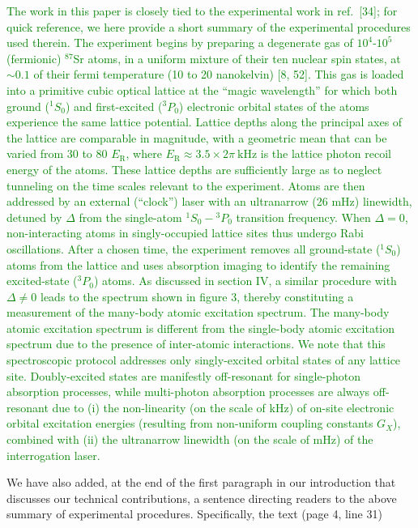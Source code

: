 \documentclass[preprint]{revtex4-1}
\renewcommand{\t}{\text} %
\newcommand{\1}{\mathds{1}}
\newcommand{\green}[1]{\textcolor{green}{#1}}
\begin{document}
\begin{enumerate}
  \green{The work in this paper is closely tied to the experimental
    work in ref.~[34]; for quick reference, we here provide a short
    summary of the experimental procedures used therein.  The
    experiment begins by preparing a degenerate gas of $10^4$-$10^5$
    (fermionic) ${}^{87}$Sr atoms, in a uniform mixture of their ten
    nuclear spin states, at $\sim0.1$ of their fermi temperature (10
    to 20 nanokelvin) [8, 52].  This gas is loaded into a primitive
    cubic optical lattice at the ``magic wavelength'' for which both
    ground (${}^1S_0$) and first-excited (${}^3P_0$) electronic
    orbital states of the atoms experience the same lattice potential.
    Lattice depths along the principal axes of the lattice are
    comparable in magnitude, with a geometric mean that can be varied
    from 30 to 80 $E_{\t{R}}$, where
    $E_{\t{R}}\approx3.5\times2\pi~\t{kHz}$ is the lattice photon
    recoil energy of the atoms.  These lattice depths are sufficiently
    large as to neglect tunneling on the time scales relevant to the
    experiment.  Atoms are then addressed by an external (``clock'')
    laser with an ultranarrow (26 mHz) linewidth, detuned by $\Delta$
    from the single-atom ${}^1S_0-{}^3P_0$ transition frequency.  When
    $\Delta=0$, non-interacting atoms in singly-occupied lattice sites
    thus undergo Rabi oscillations.  After a chosen time, the
    experiment removes all ground-state (${}^1S_0$) atoms from the
    lattice and uses absorption imaging to identify the remaining
    excited-state (${}^3P_0$) atoms.  As discussed in section IV, a
    similar procedure with $\Delta\ne0$ leads to the spectrum shown in
    figure 3, thereby constituting a measurement of the many-body
    atomic excitation spectrum.  The many-body atomic excitation
    spectrum is different from the single-body atomic excitation
    spectrum due to the presence of inter-atomic interactions.  We
    note that this spectroscopic protocol addresses only
    singly-excited orbital states of any lattice site.  Doubly-excited
    states are manifestly off-resonant for single-photon absorption
    processes, while multi-photon absorption processes are always
    off-resonant due to (i) the non-linearity (on the scale of kHz) of
    on-site electronic orbital excitation energies (resulting from
    non-uniform coupling constants $G_X$), combined with (ii) the
    ultranarrow linewidth (on the scale of mHz) of the interrogation
    laser.}

  We have also added, at the end of the first paragraph in our
  introduction that discusses our technical contributions, a sentence
  directing readers to the above summary of experimental procedures.
  Specifically, the text (page 4, line 31)


\end{enumerate}
\end{document}
